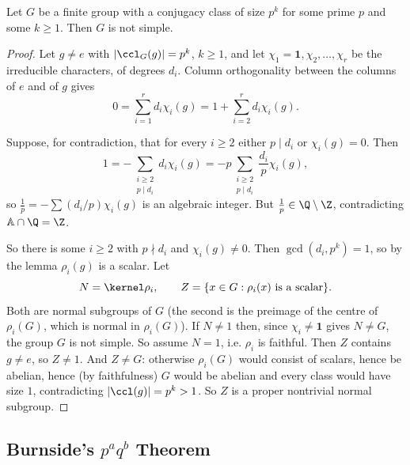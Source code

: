 \begin{theorem}[Burnside]
	Let $G$ be a finite group with a conjugacy class of size $p^k$ for some prime $p$ and some $k\geq 1$. Then $G$ is not simple.
\end{theorem}
\begin{proof}
	Let $g\neq e$ with $|\ccl_G(g)| = p^k$, $k\geq1$, and let $\chi_1 = \mathbf1,\chi_2,\dots,\chi_r$ be the irreducible characters, of degrees $d_i$. Column orthogonality between the columns of $e$ and of $g$ gives
	$$0 = \sum_{i=1}^r d_i\chi_i(g) = 1 + \sum_{i=2}^rd_i\chi_i(g).$$

	Suppose, for contradiction, that for every $i\geq 2$ either $p\mid d_i$ or $\chi_i(g) = 0$. Then
	$$1 = -\sum_{\substack{i\geq2 \\ p\mid d_i}}d_i\chi_i(g) = -p\sum_{\substack{i\geq2\\p\mid d_i}}\frac{d_i}{p}\chi_i(g),$$
	so $\frac1p = -\sum(d_i/p)\chi_i(g)$ is an algebraic integer. But $\frac1p\in\Q\setminus\Z$, contradicting $\mathbb A\cap\Q = \Z$.

	So there is some $i\geq 2$ with $p\nmid d_i$ and $\chi_i(g)\neq0$. Then $\gcd(d_i, p^k) = 1$, so by the lemma $\rho_i(g)$ is a scalar. Let
	$$N = \kernel\rho_i, \qquad Z = \{x\in G : \rho_i(x)\text{ is a scalar}\}.$$
	Both are normal subgroups of $G$ (the second is the preimage of the centre of $\rho_i(G)$, which is normal in $\rho_i(G)$). If $N\neq 1$ then, since $\chi_i\neq\mathbf1$ gives $N\neq G$, the group $G$ is not simple. So assume $N = 1$, i.e. $\rho_i$ is faithful. Then $Z$ contains $g\neq e$, so $Z\neq 1$. And $Z\neq G$: otherwise $\rho_i(G)$ would consist of scalars, hence be abelian, hence (by faithfulness) $G$ would be abelian and every class would have size $1$, contradicting $|\ccl(g)| = p^k>1$. So $Z$ is a proper nontrivial normal subgroup.
\end{proof}

\subsection{Burnside's \texorpdfstring{$p^aq^b$}{p\textasciicircum a q\textasciicircum b} Theorem}

